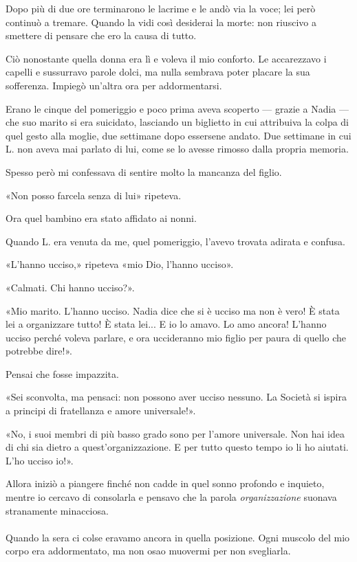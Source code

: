 \documentclass[a4paper,12pt]{book}
\begin{document}
Dopo più di due ore terminarono le lacrime e le andò via la voce; lei però
continuò a tremare. Quando la vidi così desiderai la morte: non riuscivo a
smettere di pensare che ero la causa di tutto.

Ciò nonostante quella donna era lì e voleva il mio conforto. Le accarezzavo i
capelli e sussurravo parole dolci, ma nulla sembrava poter placare la sua
sofferenza. Impiegò un'altra ora per addormentarsi.

Erano le cinque del pomeriggio e poco prima aveva scoperto --- grazie a Nadia
--- che suo marito si era suicidato, lasciando un biglietto in cui attribuiva la
colpa di quel gesto alla moglie, due settimane dopo essersene andato. Due
settimane in cui L. non aveva mai parlato di lui, come se lo avesse rimosso
dalla propria memoria.

Spesso però mi confessava di sentire molto la mancanza del figlio.

«Non posso farcela senza di lui» ripeteva.

Ora quel bambino era stato affidato ai nonni.

Quando L. era venuta da me, quel pomeriggio, l'avevo trovata adirata e confusa.

«L'hanno ucciso,» ripeteva «mio Dio, l'hanno ucciso».

«Calmati. Chi hanno ucciso?».

«Mio marito. L'hanno ucciso. Nadia dice che si è ucciso ma non è vero! È stata
lei a organizzare tutto! È stata lei... E io lo amavo. Lo amo ancora! L'hanno
ucciso perché voleva parlare, e ora uccideranno mio figlio per paura di quello
che potrebbe dire!».

Pensai che fosse impazzita.

«Sei sconvolta, ma pensaci: non possono aver ucciso nessuno. La Società si ispira
a principi di fratellanza e amore universale!».

«No, i suoi membri di più basso grado sono per l'amore universale. Non hai idea
di chi sia dietro a quest'organizzazione. E per tutto questo tempo io li ho
aiutati. L'ho ucciso io!».

Allora iniziò a piangere finché non cadde in quel sonno profondo e inquieto,
mentre io cercavo di consolarla e pensavo che la parola \emph{organizzazione}
suonava stranamente minacciosa.

\paragraph{}
Quando la sera ci colse eravamo ancora in quella posizione. Ogni muscolo del
mio corpo era addormentato, ma non osao muovermi per non svegliarla.
\end{document}
